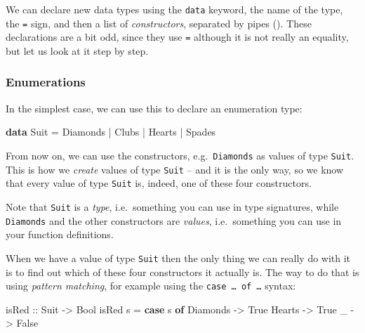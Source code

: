 \documentclass[11pt,
  american,
  DIV13]{article}
\newenvironment{Shaded}{}{}
\newcommand{\DataTypeTok}[1]{\textcolor[rgb]{0.56,0.13,0.00}{#1}}
\newcommand{\KeywordTok}[1]{\textcolor[rgb]{0.00,0.44,0.13}{\textbf{#1}}}
\newcommand{\NormalTok}[1]{#1}
\newcommand{\OperatorTok}[1]{\textcolor[rgb]{0.40,0.40,0.40}{#1}}
\newcommand{\OtherTok}[1]{\textcolor[rgb]{0.00,0.44,0.13}{#1}}
\begin{document}
We can declare new data types using the \texttt{data} keyword, the name
of the type, the \texttt{=} sign, and then a list of
\emph{constructors}, separated by pipes (\texttt{\textbar{}}). These
declarations are a bit odd, since they use \texttt{=} although it is not
really an equality, but let us look at it step by step.

\hypertarget{enumerations}{%
\subsubsection{Enumerations}\label{enumerations}}

In the simplest case, we can use this to declare an enumeration type:

\begin{Shaded}
\begin{Highlighting}[]
\KeywordTok{data} \DataTypeTok{Suit} \OtherTok{=} \DataTypeTok{Diamonds} \OperatorTok{|} \DataTypeTok{Clubs} \OperatorTok{|} \DataTypeTok{Hearts} \OperatorTok{|} \DataTypeTok{Spades}
\end{Highlighting}
\end{Shaded}

From now on, we can use the constructors, e.g.~\texttt{Diamonds} as
values of type \texttt{Suit}. This is how we \emph{create} values of
type \texttt{Suit} -- and it is the only way, so we know that every
value of type \texttt{Suit} is, indeed, one of these four constructors.

Note that \texttt{Suit} is a \emph{type}, i.e.~something you can use in
type signatures, while \texttt{Diamonds} and the other constructors are
\emph{values}, i.e.~something you can use in your function definitions.

When we have a value of type \texttt{Suit} then the only thing we can
really do with it is to find out which of these four constructors it
actually is. The way to do that is using \emph{pattern matching}, for
example using the \texttt{case\ \ldots{}\ of\ \ldots{}} syntax:

\begin{Shaded}
\begin{Highlighting}[]
\OtherTok{isRed ::} \DataTypeTok{Suit} \OtherTok{{-}\textgreater{}} \DataTypeTok{Bool}
\NormalTok{isRed s }\OtherTok{=} \KeywordTok{case}\NormalTok{ s }\KeywordTok{of}
  \DataTypeTok{Diamonds} \OtherTok{{-}\textgreater{}} \DataTypeTok{True}
  \DataTypeTok{Hearts} \OtherTok{{-}\textgreater{}} \DataTypeTok{True}
\NormalTok{  \_ }\OtherTok{{-}\textgreater{}} \DataTypeTok{False}
\end{Highlighting}
\end{Shaded}
\end{document}
